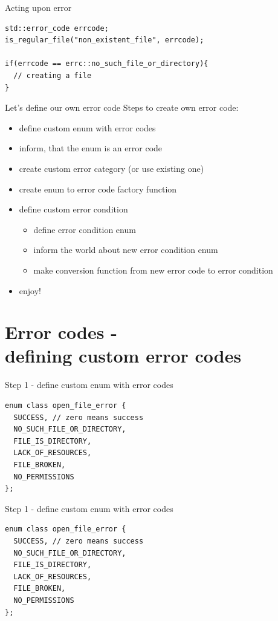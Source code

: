 \documentclass[10pt]{beamer}
\begin{document}
\begin{frame}[fragile]{Acting upon error}
	\begin{verbatim}
std::error_code errcode;
is_regular_file("non_existent_file", errcode);
  
if(errcode == errc::no_such_file_or_directory){
  // creating a file
}
	\end{verbatim}
\end{frame}

\begin{frame}{Let's define our own error code}
	Steps to create own error code:
	\begin{itemize}[<+- | alert@+>]
		\item define custom enum with error codes
		\item inform, that the enum is an error code
		\item create custom error category (or use existing one)
		\item create enum to error code factory function
		\item define custom error condition
		\begin{itemize}
			\item define error condition enum
			\item inform the world about new error condition enum
			\item make conversion function from new error code to error condition
		\end{itemize}
		\item enjoy!
	\end{itemize}
\end{frame}

\section{Error codes - \\ defining custom error codes}

\begin{frame}[fragile]{Step 1 - define custom enum with error codes}
	\begin{verbatim}
enum class open_file_error {
  SUCCESS, // zero means success
  NO_SUCH_FILE_OR_DIRECTORY,
  FILE_IS_DIRECTORY,
  LACK_OF_RESOURCES,
  FILE_BROKEN,
  NO_PERMISSIONS
};
	\end{verbatim}
\end{frame}

\begin{frame}[fragile]{Step 1 - define custom enum with error codes}
\begin{verbatim}
enum class open_file_error {
  SUCCESS, // zero means success
  NO_SUCH_FILE_OR_DIRECTORY,
  FILE_IS_DIRECTORY,
  LACK_OF_RESOURCES,
  FILE_BROKEN,
  NO_PERMISSIONS
};
\end{verbatim}
\end{frame}
\end{document}
